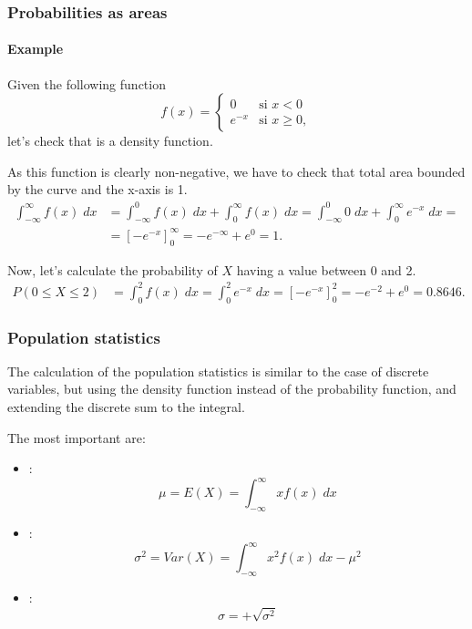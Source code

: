 \begin{frame}
\frametitle{Probabilities as areas}
\framesubtitle{Example}
Given the following function
\[
f(x) =
\begin{cases}
0 & \mbox{si $x<0$}\\
e^{-x} & \mbox{si $x\geq 0$},
\end{cases}
\]
let's check that is a density function. 

As this function is clearly non-negative, we have to check that total area bounded by the curve and the x-axis is 1.
\begin{align*}
\int_{-\infty}^\infty f(x)\;dx &= \int_{-\infty}^0 f(x)\;dx +\int_0^\infty f(x)\;dx = \int_{-\infty}^0 0\;dx +\int_0^\infty e^{-x}\;dx =\\
&= \left[-e^{-x}\right]_0^{\infty} = -e^{-\infty}+e^0 = 1.
\end{align*}

Now, let's calculate the probability of $X$ having a value between 0 and 2. 
\begin{align*}
P(0\leq X\leq 2) &= \int_0^2 f(x)\;dx = \int_0^2 e^{-x}\;dx = \left[-e^{-x}\right]_0^2 = -e^{-2}+e^0 = 0.8646.
\end{align*}
\end{frame}


\begin{frame}
\frametitle{Population statistics}
The calculation of the population statistics is similar to the case of discrete variables, but using the density function instead of the probability function, and extending the discrete sum to the integral.

The most important are:
\begin{itemize}
\item {}:
\[
\mu = E(X) = \int_{-\infty}^\infty x f(x)\; dx
\]
\item {}:
\[
\sigma^2 = Var(X) = \int_{-\infty}^\infty x^2f(x)\; dx -\mu^2
\]
\item {}:
\[
\sigma = +\sqrt{\sigma^2}
\]
\end{itemize}
\end{frame}


